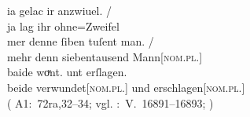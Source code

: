 \begin{exe}
\ex \label{ex:konjadjvvbeide}
	
		\gll ia gelac ir anzwiuel. {/} \\
			ja lag ihr ohne=Zweifel \\
		\gll mer denne {ſiben tuſent} man. {/} \\
			mehr denn siebentausend Mann[\textsc{nom.pl.\MascM}] \\
		\gll baide woͮnt. unt erſlagen. \\
			beide verwundet[\textsc{nom.pl.\MascM}] und erschlagen[\textsc{nom.pl.\MascM}] \\
		\trans {}
			(%
				A1:~72ra,32--34; vgl.
				\KC:~V.~16891--16893;
				\cite[386]{schroeder1895}%
			)
	


\end{exe}
